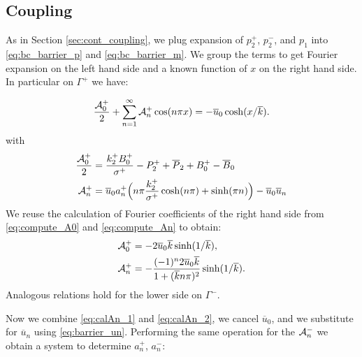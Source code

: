 \documentclass[a4paper,10pt]{article}
\def\ol#1{\overline{#1}}
\begin{document}
\subsection{Coupling}

As in Section \ref{sec:cont_coupling}, we plug expansion of $p_2^+$, $p_2^-$, and $p_1$ into \eqref{eq:bc_barrier_p} and \eqref{eq:bc_barrier_m}. 
We group the terms to get Fourier expansion on the left hand side and a known function of $x$ on the right hand side.
In particular on  $\Gamma^+$ we have:
% 

\begin{equation}
    \frac{{\cal A}_0^+}{2} + \sum^{\infty}_{n=1} {\cal A}_n^+ \cos (n\pi x) =  - \ol{u}_0 \cosh(x/ \ol{k}).
\end{equation}
with
\begin{align}
    \label{eq:calA0_1}
    \frac{{\cal A}_0^+}{2} &= \frac{k_2^+ B_0^+}{\sigma^+} - P_2^+ + \ol{P}_2 + B_0^+ - \ol{B}_0\\
    \label{eq:calAn_1}
    {\cal A}_n^+          &=  \ol{u}_0 a_n^+ \Big( n \pi \frac{k_2^+ }{\sigma^+}  \cosh(n \pi) 
        +     \sinh(\pi n)  \Big) 
        - \ol{u}_0 \ol{u}_n   
\end{align}
We reuse the calculation of Fourier coefficients of the right hand side from \eqref{eq:compute_A0} and \eqref{eq:compute_An} to obtain:
\begin{align}
    \label{eq:calA0_2}
    {\cal A}_0^+ &= - 2 \ol{u}_0 \ol{k}\sinh( 1/\ol{k} ), \\
    \label{eq:calAn_2}
    {\cal A}_n^+ &=  - \frac{(-1)^n  2 \ol{u}_0 \ol{k}}{1+(\ol{k} n \pi)^2}\sinh(1/\ol{k}).
\end{align}
Analogous relations hold for the lower side on $\Gamma^-$.

Now we combine \eqref{eq:calAn_1} and \eqref{eq:calAn_2}, we cancel $\ol{u}_0$, and we substitute for $\ol{u}_n$ using \eqref{eq:barrier_un}.
Performing the same operation for the ${\cal A}_n^-$  we obtain a system to determine $a_n^+$, $a_n^-$:
\end{document}
